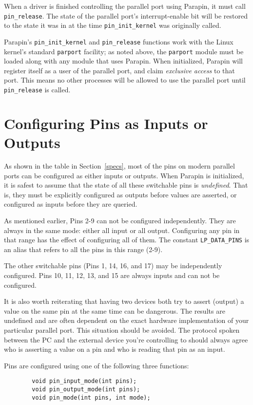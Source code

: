 \documentclass{article}
\begin{document}
When a driver is finished controlling the parallel port using Parapin,
it must call {\tt pin\_release}.  The state of the parallel port's
interrupt-enable bit will be restored to the state it was in at the
time {\tt pin\_init\_kernel} was originally called.

Parapin's {\tt pin\_init\_kernel} and {\tt pin\_release} functions
work with the Linux kernel's standard {\tt parport} facility; as noted
above, the {\tt parport} module must be loaded along with any module
that uses Parapin.  When initialized, Parapin will register itself as
a user of the parallel port, and claim {\em exclusive access} to that
port.  This means no other processes will be allowed to use the
parallel port until {\tt pin\_release} is called.


\section{Configuring Pins as Inputs or Outputs}
\label{configuring}

As shown in the table in Section~\ref{specs}, most of the pins on
modern parallel ports can be configured as either inputs or outputs.
When Parapin is initialized, it is safest to assume that the state of
all these switchable pins is {\em undefined}.  That is, they must be
explicitly configured as outputs before values are asserted, or
configured as inputs before they are queried.

As mentioned earlier, Pins 2-9 can not be configured independently.
They are always in the same mode: either all input or all output.
Configuring any pin in that range has the effect of configuring all of
them.  The constant {\tt LP\_DATA\_PINS} is an alias that refers to
all the pins in this range (2-9).

The other switchable pins (Pins 1, 14, 16, and 17) may be
independently configured.  Pins 10, 11, 12, 13, and 15 are always
inputs and can not be configured.

It is also worth reiterating that having two devices both try to
assert (output) a value on the same pin at the same time can be
dangerous.  The results are undefined and are often dependent on the
exact hardware implementation of your particular parallel port.  This
situation should be avoided.  The protocol spoken between the PC and
the external device you're controlling to should always agree who is
asserting a value on a pin and who is reading that pin as an input.

Pins are configured using one of the following three functions:
\begin{verbatim}
        void pin_input_mode(int pins);
        void pin_output_mode(int pins);
        void pin_mode(int pins, int mode);
\end{verbatim}
\end{document}

